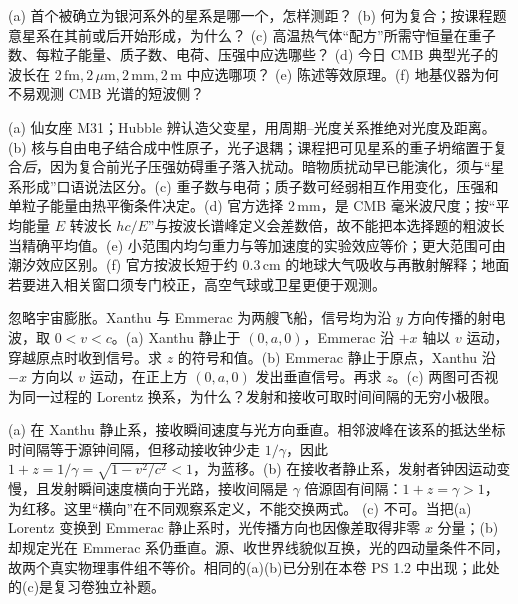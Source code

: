 \begin{exercise}
(a) 首个被确立为银河系外的星系是哪一个，怎样测距？
(b) 何为复合；按课程题意星系在其前或后开始形成，为什么？
(c) 高温热气体“配方”所需守恒量在重子数、每粒子能量、质子数、电荷、压强中应选哪些？
(d) 今日 CMB 典型光子的波长在 $2\,\mathrm{fm},2\,\mu\mathrm m,2\,\mathrm{mm},2\,\mathrm m$ 中应选哪项？
(e) 陈述等效原理。(f) 地基仪器为何不易观测 CMB 光谱的短波侧？
\end{exercise}
\begin{solution}
(a) 仙女座 M31；Hubble 辨认造父变星，用周期--光度关系推绝对光度及距离。(b) 核与自由电子结合成中性原子，光子退耦；课程把可见星系的重子坍缩置于复合\emph{后}，因为复合前光子压强妨碍重子落入扰动。暗物质扰动早已能演化，须与“星系形成”口语说法区分。(c) 重子数与电荷；质子数可经弱相互作用变化，压强和单粒子能量由热平衡条件决定。(d) 官方选择 $2\,\mathrm{mm}$，是 CMB 毫米波尺度；按“平均能量 $E$ 转波长 $hc/E$”与按波长谱峰定义会差数倍，故不能把本选择题的粗波长当精确平均值。(e) 小范围内均匀重力与等加速度的实验效应等价；更大范围可由潮汐效应区别。(f) 官方按波长短于约 $0.3\,\mathrm{cm}$ 的地球大气吸收与再散射解释；地面若要进入相关窗口须专门校正，高空气球或卫星更便于观测。
\end{solution}

\begin{exercise}
忽略宇宙膨胀。Xanthu 与 Emmerac 为两艘飞船，信号均为沿 $y$ 方向传播的射电波，取 $0<v<c$。(a) Xanthu 静止于 $(0,a,0)$，Emmerac 沿 $+x$ 轴以 $v$ 运动，穿越原点时收到信号。求 $z$ 的符号和值。(b) Emmerac 静止于原点，Xanthu 沿 $-x$ 方向以 $v$ 运动，在正上方 $(0,a,0)$ 发出垂直信号。再求 $z$。(c) 两图可否视为同一过程的 Lorentz 换系，为什么？发射和接收可取时间间隔的无穷小极限。
\end{exercise}
\begin{solution}
(a) 在 Xanthu 静止系，接收瞬间速度与光方向垂直。相邻波峰在该系的抵达坐标时间隔等于源钟间隔，但移动接收钟少走 $1/\gamma$，因此 $1+z=1/\gamma=\sqrt{1-v^2/c^2}<1$，为蓝移。(b) 在接收者静止系，发射者钟因运动变慢，且发射瞬间速度横向于光路，接收间隔是 $\gamma$ 倍源固有间隔：$1+z=\gamma>1$，为红移。这里“横向”在不同观察系定义，不能交换两式。
(c) 不可。当把(a) Lorentz 变换到 Emmerac 静止系时，光传播方向也因像差取得非零 $x$ 分量；(b)却规定光在 Emmerac 系仍垂直。源、收世界线貌似互换，光的四动量条件不同，故两个真实物理事件组不等价。相同的(a)(b)已分别在本卷 PS 1.2 中出现；此处的(c)是复习卷独立补题。
\end{solution}

